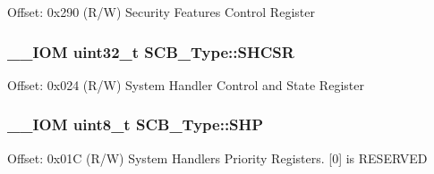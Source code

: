 Offset\-: 0x290 (R/\-W) Security Features Control Register \hypertarget{struct_s_c_b___type_a7b5ae9741a99808043394c4743b635c4}{
\subsubsection[{S\-H\-C\-S\-R}]{\setlength{\rightskip}{0pt plus 5cm}\-\_\-\-\_\-\-I\-O\-M uint32\-\_\-t S\-C\-B\-\_\-\-Type\-::\-S\-H\-C\-S\-R}}\label{struct_s_c_b___type_a7b5ae9741a99808043394c4743b635c4}
Offset\-: 0x024 (R/\-W) System Handler Control and State Register \hypertarget{struct_s_c_b___type_a5c40d124f95a3f7f431a3d5409d6ad28}{
\subsubsection[{S\-H\-P}]{\setlength{\rightskip}{0pt plus 5cm}\-\_\-\-\_\-\-I\-O\-M uint8\-\_\-t S\-C\-B\-\_\-\-Type\-::\-S\-H\-P}}\label{struct_s_c_b___type_a5c40d124f95a3f7f431a3d5409d6ad28}
Offset\-: 0x01\-C (R/\-W) System Handlers Priority Registers. \mbox{[}0\mbox{]} is R\-E\-S\-E\-R\-V\-E\-D

